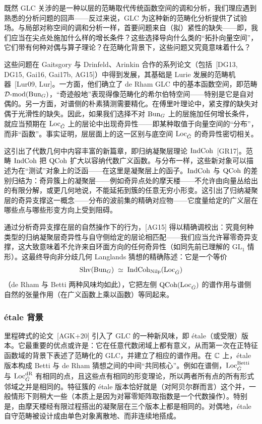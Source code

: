 既然 GLC 关涉的是一种以层的范畴取代传统函数空间的调和分析，我们理应遇到熟悉的分析问题的回声——反过来说，GLC 为这种新的范畴化分析提供了试验场。与局部对称空间的调和分析一样，首要问题来自（拟）紧性的缺失——即，我们应当在尖点处施加什么样的增长条件？这些选择导向什么类的“拓扑向量空间”，它们带有何种对偶与算子理论？在范畴化背景下，这些问题又究竟意味着什么？

这些问题在 Gaitsgory 与 Drinfeld、Arinkin 合作的系列论文（包括~[DG13, DG15, Gai16, Gai17b, AG15]）中得到发展，其基础是 Lurie 发展的范畴机器~[Lur09, Lur]。一方面，他们确立了 de Rham GLC 中的基本函数空间，即范畴 $\mathcal{D}\text{-}\mathrm{mod}(\operatorname{Bun}_{G})$，“奇迹般地”表现得像范畴化的希尔伯特空间——特别是它是自对偶的。另一方面，对谱侧的朴素猜测需要精化。在傅里叶理论中，紧支撑的缺失对偶于光滑性的缺失。因此，如果我们选择不对 $\operatorname{Bun}_{G}$ 上的层施加任何增长条件，就应当预期在 $\operatorname{Loc}_{\check{G}}$ 上的层论中出现奇异性——即某种取值于向量空间的“分布”，而非“函数”。事实证明，层层面上的这一区别与底空间 $\operatorname{Loc}_{\check{G}}$ 的奇异性密切相关。

这引出了代数几何中内容丰富的新篇章，即归纳凝聚层理论 $\operatorname{IndCoh}$~[GR17]。范畴 $\operatorname{IndCoh}$ 把 $\operatorname{QCoh}$ 扩大以容纳代数广义函数。与分布一样，这些新对象可以描述为在“测试”对象上的泛函——在这里是凝聚层上的函子。$\operatorname{IndCoh}$ 与 $\operatorname{QCoh}$ 的差别归结为：奇异簇上的凝聚层——例如奇异点处的摩天楼——不允许由向量丛给出的有限分解，或更几何地说，不能延拓到簇的任意无穷小形变。这引出了归纳凝聚层的奇异支撑这一概念——分布的波前集的精确对应物——它度量给定的广义层在哪些点与哪些形变方向上受到阻碍。

通过分析奇异支撑在层的自然操作下的行为，[AG15] 得以精确调校出：究竟何种类型的归纳凝聚层奇异性与自守侧给定的层论相匹配——我们应当允许幂零奇异支撑，这大致意味着不允许来自环面方向的任何奇异性（如同先前已理解的 $\mathrm{GL}_{1}$ 情形）。这最终导向非分歧几何 Langlands 猜想的精确陈述：它是一个等价
\[
\operatorname{Shv}(\operatorname{Bun}_{G})\;\simeq\;\operatorname{IndCoh}_{\operatorname{Nilp}}(\operatorname{Loc}_{\check{G}})
\]
（de Rham 与 Betti 两种风味均如此），它把左侧 $\operatorname{QCoh}(\operatorname{Loc}_{\check{G}})$ 的谱作用与谱侧自然的张量作用（在广义函数上乘以函数）等同起来。

\subsubsection{étale 背景}\label{sec:5.1.1}

里程碑式的论文~[AGK+20] 引入了 GLC 的一种新风味，即 étale（或受限）版本。它最重要的优点或许是：它在任意代数闭域上都有意义，从而第一次在正特征函数域的背景下表述了范畴化的 GLC，并建立了相应的谱作用。在 $\mathbb{C}$ 上，étale 版本构成 Betti 与 de Rham 猜想之间的中间“共同核心”。例如在谱侧，$\operatorname{Loc}^{\mathrm{Betti}}_{\check{G}}$ 与 $\operatorname{Loc}^{\mathrm{dR}}_{\check{G}}$ 有相同的点，且这些点有相同的形变理论，所以两者所有点的所有形式邻域之并是相同的。特征簇的 étale 版本恰好就是（对阿贝尔群而言）这个并，一般情形下则稍大一些（本质上是因为对幂零矩阵取指数是一个代数操作）。特别是，由摩天楼经有限过程搭出的凝聚层在三个版本上都是相同的。对偶地，étale 自守范畴被设计成由单色对象离散地、而非连续地搭成。

